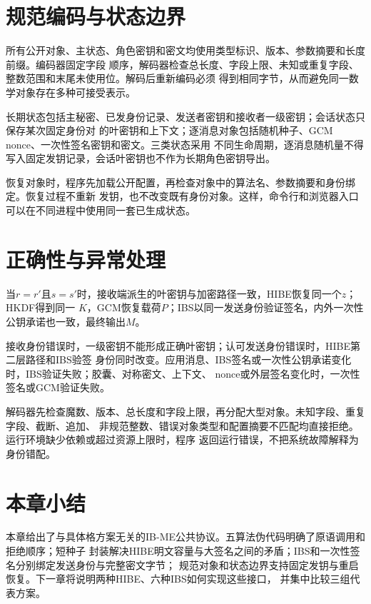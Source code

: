 \section{规范编码与状态边界}

所有公开对象、主状态、角色密钥和密文均使用类型标识、版本、参数摘要和长度前缀。编码器固定字段
顺序，解码器检查总长度、字段上限、未知或重复字段、整数范围和末尾未使用位。解码后重新编码必须
得到相同字节，从而避免同一数学对象存在多种可接受表示。

长期状态包括主秘密、已发身份记录、发送者密钥和接收者一级密钥；会话状态只保存某次固定身份对
的叶密钥和上下文；逐消息对象包括随机种子、GCM nonce、一次性签名密钥和密文。三类状态采用
不同生命周期，逐消息随机量不得写入固定发钥记录，会话叶密钥也不作为长期角色密钥导出。

恢复对象时，程序先加载公开配置，再检查对象中的算法名、参数摘要和身份绑定。恢复过程不重新
发钥，也不改变既有身份对象。这样，命令行和浏览器入口可以在不同进程中使用同一套已生成状态。

\section{正确性与异常处理}

当$r=r'$且$s=s'$时，接收端派生的叶密钥与加密路径一致，HIBE恢复同一个$z$；HKDF得到同一
$K$，GCM恢复载荷$P$；IBS以同一发送身份验证签名，内外一次性公钥承诺也一致，最终输出$M$。

接收身份错误时，一级密钥不能形成正确叶密钥；认可发送身份错误时，HIBE第二层路径和IBS验签
身份同时改变。应用消息、IBS签名或一次性公钥承诺变化时，IBS验证失败；胶囊、对称密文、上下文、
nonce或外层签名变化时，一次性签名或GCM验证失败。

解码器先检查魔数、版本、总长度和字段上限，再分配大型对象。未知字段、重复字段、截断、追加、
非规范整数、错误对象类型和配置摘要不匹配均直接拒绝。运行环境缺少依赖或超过资源上限时，程序
返回运行错误，不把系统故障解释为身份错配。

\section{本章小结}

本章给出了与具体格方案无关的IB-ME公共协议。五算法伪代码明确了原语调用和拒绝顺序；短种子
封装解决HIBE明文容量与大签名之间的矛盾；IBS和一次性签名分别绑定发送身份与完整密文字节；
规范对象和状态边界支持固定发钥与重启恢复。下一章将说明两种HIBE、六种IBS如何实现这些接口，
并集中比较三组代表方案。

